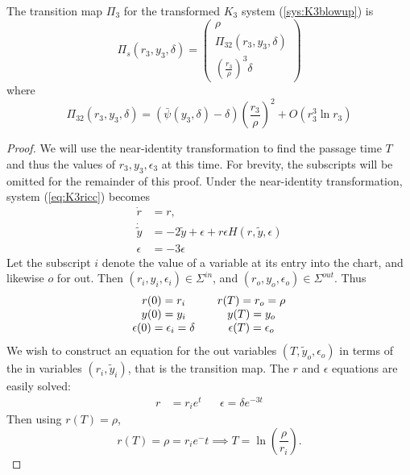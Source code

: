 \begin{prop}
	The transition map $\Pi_3$ for the transformed $K_3$ system (\ref{sys:K3blowup}) is
	$$ \Pi_s(r_3,y_3,\delta) = \begin{pmatrix}
	\rho \\ 
	\Pi_{32}(r_3,y_3,\delta) \\ 
	\left(\frac{r_3}{\rho}\right)^3\delta
	\end{pmatrix} $$ 
	where $$\Pi_{32}(r_3,y_3,\delta)=\left(\bar{\psi}(y_3,\delta)-\delta\right)\left(\frac{r_3}{\rho}\right)^2 + O(r^3_3\ln r_3)$$
\end{prop}
\begin{proof}
	We will use the near-identity transformation to find the passage time $T$ and thus the values of $r_3,y_3,\epsilon_3$ at this time. For brevity, the subscripts will be omitted for the remainder of this proof. Under the near-identity transformation, system (\ref{eq:K3ricc}) becomes
	\begin{subequations}
		\begin{align}
		\dot{r} &= r,\label{sys:K3riccNIr}\\
		\dot{\tilde{y}}&=-2\tilde{y}+\epsilon+r\epsilon H(r,\tilde{y},\epsilon)\label{sys:K3riccNIy}\\
		\epsilon &= -3\epsilon
		\label{sys:K3riccNIeps}
		\end{align}
	\end{subequations}
Let the subscript $i$ denote the value of a variable at its entry into the chart, and likewise $o$ for out. Then $(r_i,y_i,\epsilon_i)\in \Sigma^{in}$, and $(r_o,y_o,\epsilon_o)\in \Sigma^{out}$. Thus 
$$\begin{array}{c c c}
r(0)=r_i & &r(T)=r_o=\rho\\
y(0)=y_i & &y(T)=y_o\\
\epsilon(0)=\epsilon_i=\delta& & \epsilon(T)=\epsilon_o
\end{array}
$$
We wish to construct an equation for the out variables $(T,\tilde{y}_o,\epsilon_o)$ in terms of the in variables $ (r_i,\tilde{y}_i) $, that is the transition map. The $r$ and $\epsilon$ equations are easily solved:
\begin{align}
r&=r_ie^t &&\epsilon=\delta e^{-3t}
\end{align}
Then using $r(T)=\rho$, 
$$r(T)=\rho=r_ie^-t \implies T=\ln\left(\frac{\rho}{r_i}\right).$$


\end{proof}
